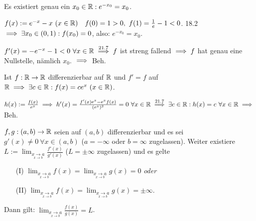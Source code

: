 \documentclass[a4paper,oneside,DIV15,BCOR12mm]{scrbook}
\begin{document}
\begin{beispiele}
\item Es existiert genau ein $x_0 \in \mathbb{R}: e^{-x_0} = x_0$.
	\begin{beweis}
	$f(x) := e^{-x}-x\ (x \in \mathbb{R})\quad f(0) = 1 > 0,\ f(1) = \frac{1}{e}-1 < 0$. 18.2 $\implies \exists x_0 \in (0,1): f(x_0) = 0$, also: $e^{-x_0} = x_0$.

	$f'(x) = -e^{-x}-1 < 0\ \forall x \in \mathbb{R} \overset{\text{21.7}}{\implies} f$ ist streng fallend $\implies f$ hat genau eine Nullstelle, nämlich $x_0$. $\implies$ Beh.
	\end{beweis}
\item Ist $f: \mathbb{R} \to \mathbb{R}$ differenzierbar auf $\mathbb{R}$ und $f' = f$ auf $\mathbb{R} \implies \exists c \in \mathbb{R}: f(x) = ce^x\ (x \in \mathbb{R})$.
	\begin{beweis}
	$h(x) := \frac{f(x)}{e^x} \implies h'(x) = \frac{f'(x)e^x - e^xf(x)}{(e^x)^2} = 0\ \forall x \in \mathbb{R} \overset{\text{21.7}}{\implies} \exists c \in \mathbb{R}: h(x) = c\ \forall x \in \mathbb{R} \implies$ Beh.
	\end{beweis}
\end{beispiele}

\newcommand{\dlim}[2]{\displaystyle{\lim_{#1}{#2}}}

\begin{satz}
$f,g:(a,b) \to \mathbb{R}$ seien auf $(a,b)$ differenzierbar und es sei $g'(x) \ne 0\ \forall x \in (a,b)$ ($a=-\infty$ oder $b=\infty$ zugelassen). Weiter existiere $L := \dlim{\underset{x \to b}{x \to a}}{\frac{f'(x)}{g'(x)}}$ ($L=\pm\infty$ zugelassen) und es gelte
\begin{enumerate}
\item[(I)] $\dlim{\underset{x \to b}{x \to a}}{f(x)} = \dlim{\underset{x \to b}{x \to a}}{g(x)} = 0$ \emph{oder}
\item[(II)] $\dlim{\underset{x \to b}{x \to a}}{f(x)} = \dlim{\underset{x \to b}{x \to a}}{g(x)} = \pm\infty$.
\end{enumerate}

Dann gilt: $\dlim{\underset{x \to b}{x \to a}}{\frac{f(x)}{g(x)}} = L$.
\end{satz}
\end{document}
